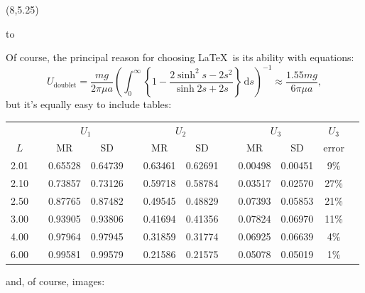 \documentclass[a0]{a0poster}
\newcommand{\ds}{\mathrm{d}s}
\def\Head#1{
  \noindent\hbox to \hsize{\hfil{\LARGE\color{DarkBlue}\sf #1}}\bigskip}
\begin{document}
  \begin{textblock}{7}(8,5.25)

    \Head{Evaluation}

    \sf
    Of course, the principal reason for choosing \LaTeX\ is its ability with
    equations:  
    \[ 
       U_\mathrm{doublet} = \frac{mg}{2\pi\mu a}\left( \int_0^\infty \left\{ 1
           - \frac{2\sinh^2{s} - 2s^2}{\sinh{2s}+2s}\right\}\,\ds
       \right)^{-1} \approx \frac{1.55mg}{6\pi\mu a}, \] 
    but it's equally easy to include tables: 
    \begin{center} 
    \begin{tabular}{cccccccccccr}
    \hline
      && \multicolumn{2}{c}{$U_1$}  && \multicolumn{2}{c}{$U_2$} 
      && \multicolumn{2}{c}{$U_3$} & $U_3$ \\ 
    $L$ &&    MR   &   SD   &&   MR   &   SD   &&   MR    &   SD & error \\ 
    \hline
    2.01 &&0.65528 &0.64739 &&0.63461 &0.62691 &&0.00498 &0.00451 & 9\%\\ 
    2.10 &&0.73857 &0.73126 &&0.59718 &0.58784 &&0.03517 &0.02570 &27\%\\ 
    2.50 &&0.87765 &0.87482 &&0.49545 &0.48829 &&0.07393 &0.05853 &21\%\\ 
    3.00 &&0.93905 &0.93806 &&0.41694 &0.41356 &&0.07824 &0.06970 &11\%\\ 
    4.00 &&0.97964 &0.97945 &&0.31859 &0.31774 &&0.06925 &0.06639 & 4\%\\ 
    6.00 &&0.99581 &0.99579 &&0.21586 &0.21575 &&0.05078 &0.05019 & 1\%\\ 
    \hline
    \end{tabular} 
    \end{center}
    and, of course, images:
    \begin{center}

\end{center}
\end{textblock}
\end{document}
